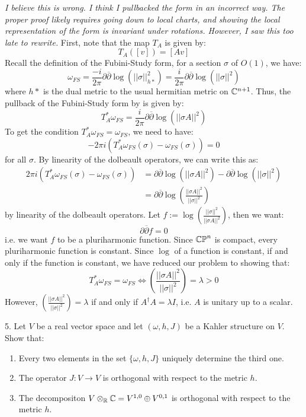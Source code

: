 \documentclass[12pt]{article}
\begin{document}
\begin{solution}
    \textit{I believe this is wrong. I think I pullbacked the form in an incorrect way. The proper proof likely requires going down to local charts, and showing the local representation of the form is invariant under rotations. However, I saw this too late to rewrite.} \bbni
    First, note that the map $T_A$ is given by: 
    \[T_A([v]) = [Av]\]
    Recall the definition of the Fubini-Study form, for a section $\sigma$ of $O(1)$, we have: 
    \[ \omega_{FS} = \frac{-i}{2\pi} \partial \overline{\partial}\log(||\sigma||^2_{h*}) =   \frac{i}{2\pi} \partial \overline{\partial}\log(||\sigma||^2) \]
    where $h*$ is the dual metric to the usual hermitian metric on $\mathbb C^{n+1}$.
    Thus, the pullback of the Fubini-Study form by is given by: 
    \[ T_A^*\omega_{FS} = \frac{i}{2\pi} \partial \overline{\partial}\log\left(||\sigma A||^2\right) \]
    To get the condition $T_A^*\omega_{FS} = \omega_{FS}$, we need to have:
    \[ -2\pi i \left(T_A^*\omega_{FS}(\sigma) - \omega_{FS}(\sigma)\right) = 0\]
    for all $\sigma$. By linearity of the dolbeault operators, we can write this as:
    \begin{align*}
        2\pi i \left(T_A^*\omega_{FS}(\sigma) - \omega_{FS}(\sigma)\right) &= \partial \overline{\partial}\log\left(||\sigma A||^2\right) - \partial \overline{\partial}\log\left(||\sigma||^2\right) \\
        &= \partial \overline{\partial}\log\left(\frac{||\sigma A||^2}{||\sigma||^2}\right)
    \end{align*}
    by linearity of the dolbeault operators. Let $f := \log\left(\frac{||\sigma||^2}{||\sigma A||^2}\right)$, then we want:
    \[ \partial \overline{\partial} f = 0\]
    i.e. we want $f$ to be a pluriharmonic function. Since $\mathbb{CP}^n$ is compact, every pluriharmonic function is constant. Since $\log$ of a function is constant, if and only if the function is constant, we have reduced our problem to showing that: 
    \[ T_A^* \omega_{FS} = \omega_{FS} \iff \left(\frac{||\sigma A||^2}{||\sigma||^2}\right) = \lambda > 0 \]
    However, $\left(\frac{||\sigma A||^2}{||\sigma||^2}\right) = \lambda$ if and only if $A^\dagger A = \lambda I$, i.e. $A$ is unitary up to a scalar. 
    
\end{solution}
\newpage

\begin{problem}{5.}
    Let $V$ be a real vector space and let $(\omega, h, J)$ be a Kahler structure on $V$. Show that: 
    \begin{enumerate}
        \item Every two elements in the set $\{ \omega, h, J \}$ uniquely determine the third one.
        \item The operator $J: V \to V$ is orthogonal with respect to the metric $h$. 
        \item The decompositon $V \otimes_\mathbb R \mathbb C = V^{1,0} \oplus V^{0,1}$ is orthogonal with respect to the metric $h$.
    \end{enumerate}
\end{problem}
\end{document}
